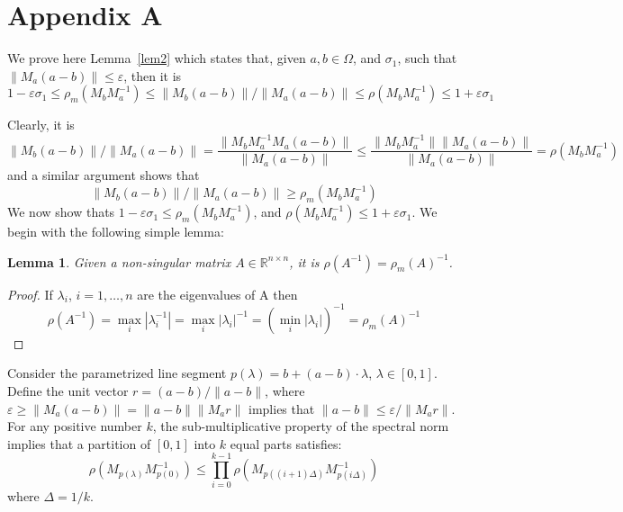 \documentclass[11pt]{article}
\newtheorem{lemma}[theorem]{Lemma}
\newcommand{\e}{\varepsilon}
\newcommand{\s}{\sigma}
\renewcommand{\l}{\lambda}
\renewcommand{\O}{\Omega}
\begin{document}
\newpage




\section*{Appendix A}

We prove here Lemma~\ref{lem2} which states that, given $a,b\in\O$, and $\s_1$, 
	such that $\|M_a(a-b)\| \le \e$, then it is 
	 \[  1-\e\s_1 \le  \rho_m(M_b M_a^{-1}) \le {\|M_b (a-b)\|}/{\|M_a (a-b)\|}  \le \rho(M_b M_a^{-1}) \le 1+\e\s_1 \]
	 
	 
Clearly, it is
\[  {\|M_b (a-b)\|}/{\|M_a (a-b)\|} = \frac{\| M_b M_a^{-1} M_a (a-b) \| }{\| M_a (a-b) \|} \le \frac{\| M_b M_a^{-1}\| \| M_a (a-b) \| }{\| M_a (a-b) \|} =  \rho(M_b M_a^{-1}) \]
and a similar argument shows that 
\[  {\|M_b (a-b)\|}/{\|M_a (a-b)\|} \ge \rho_m(M_b M_a^{-1}) \]
We now show thats $1-\e\s_1 \le \rho_m(M_{b} M_a^{-1})$, and $ \rho(M_{b} M_a^{-1}) \le 1+\e\s_1$.
We begin with the following simple lemma: 


\begin{lemma}\label{lem:rhom}
	Given a non-singular matrix $A\in\mathbb{R}^{n\times n}$, it is $\rho(A^{-1}) = \rho_m(A)^{-1}$. 
\end{lemma}
\begin{proof}
	If $\l_i$, $i=1,\dots,n$ are the eigenvalues of A then
		\[ \rho(A^{-1}) = \max_i |\l_i^{-1}| = \max_i |\l_i|^{-1} = (\min_i |\l_i|)^{-1} = \rho_m(A)^{-1} \]
\end{proof}
\vspace*{0.1in}





Consider the parametrized line segment $p(\l) = b + (a-b)\cdot\l$, $\l\in[0,1]$. Define the unit vector $r=(a-b)/\|a-b\|$, where $\e \ge \|M_a(a-b)\| = \|a-b\| \|M_a r\|$ implies that $\|a-b\| \le \e/\|M_a r\|$. 
For any positive number $k$, the sub-multiplicative property of the spectral norm implies that a partition of $[0,1]$ into $k$ equal parts satisfies: \[  \rho(M_{p(\l)} M_{p(0)}^{-1}) \le \displaystyle{\prod_{i=0}^{k-1} \rho(M_{p((i+1)\Delta)} M_{p(i\Delta)}^{-1})} \]
where $\Delta = 1/k$. 
\end{document}
